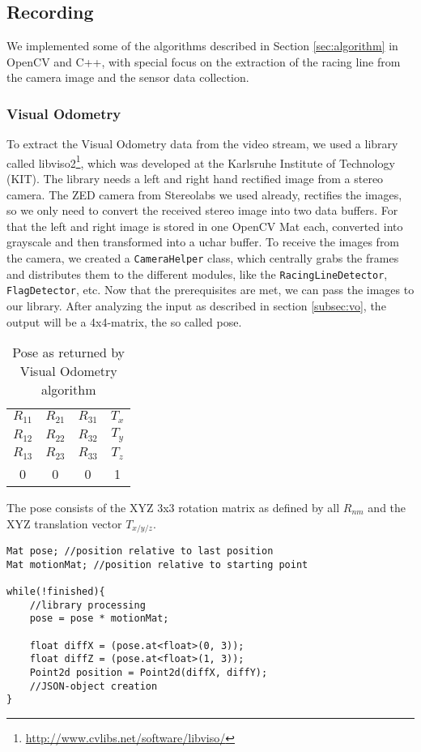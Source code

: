 \subsection{Recording}
We implemented some of the algorithms described in Section \ref{sec:algorithm} in OpenCV and C++, with special focus on the extraction of the racing line from the camera image and the sensor data collection.

\subsubsection{Visual Odometry}
To extract the Visual Odometry data from the video stream, we used a library called libviso2\footnote{\url{http://www.cvlibs.net/software/libviso/}}, which was developed at the Karlsruhe Institute of Technology (KIT). The library needs a left and right hand rectified image from a stereo camera. The ZED camera from Stereolabs we used already, rectifies the images, so we only need to convert the received stereo image into two data buffers.
For that the left and right image is stored in one OpenCV Mat each, converted into grayscale and then transformed into a uchar buffer.
To receive the images from the camera, we created a \texttt{CameraHelper} class, which centrally grabs the frames and distributes them to the different modules, like the \texttt{RacingLineDetector}, \texttt{FlagDetector}, etc.
\clearpage
Now that the prerequisites are met, we can pass the images to our library.
After analyzing the input as described in section \ref{subsec:vo}, the output will be a 4x4-matrix, the so called pose.

\begin{table}[!ht]
 \begin{center}
  \begin{tabular}{c c c c}
   $R_{11}$ & $R_{21}$ & $R_{31}$ & $T_{x}$\\
   $R_{12}$ & $R_{22}$ & $R_{32}$ & $T_{y}$\\
   $R_{13}$ & $R_{23}$ & $R_{33}$ & $T_{z}$\\
   0 & 0 & 0 & 1
  \end{tabular}
 \end{center}
 \caption{Pose as returned by Visual Odometry algorithm}
\end{table}

The pose consists of the XYZ 3x3 rotation matrix as defined by all $R_{nm}$ and the XYZ translation vector $T_{x/y/z}$. 

\begin{lstlisting}
Mat pose; //position relative to last position
Mat motionMat; //position relative to starting point

while(!finished){
	//library processing
	pose = pose * motionMat;

	float diffX = (pose.at<float>(0, 3));
	float diffZ = (pose.at<float>(1, 3));
	Point2d position = Point2d(diffX, diffY);
	//JSON-object creation 
}
\end{lstlisting}

